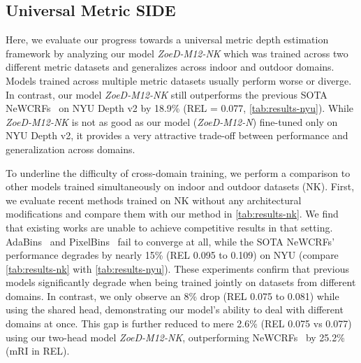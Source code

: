 \documentclass[10pt,twocolumn,letterpaper]{article}
\newcommand{\zoedmnk}{\textit{ZoeD-M12-NK}}
\begin{document}
\subsection{Universal Metric SIDE}
\label{sec:multi-dataset}
Here, we evaluate our progress towards a universal metric depth estimation framework by analyzing our model \textit{ZoeD-M12-NK} which was trained across two different metric datasets and generalizes across indoor and outdoor domains.
Models trained across multiple metric datasets usually perform worse or diverge. In contrast, our model \textit{ZoeD-M12-NK} still outperforms the previous SOTA NeWCRFs~\cite{yuan2022new} on NYU Depth v2 by 18.9\% (REL = 0.077, \cref{tab:results-nyu}).
 While \textit{ZoeD-M12-NK} is not as good as our model (\textit{ZoeD-M12-N}) fine-tuned only on NYU Depth v2, it provides a very attractive trade-off between performance and generalization across domains.
 
 To underline the difficulty of cross-domain training, we perform a comparison to other models trained simultaneously on indoor and outdoor datasets (NK). First, we evaluate recent methods trained on NK without any architectural modifications and compare them with our method in \cref{tab:results-nk}. 
We find that existing works are unable to achieve competitive results in that setting. AdaBins~\cite{bhat2021adabins} and PixelBins~\cite{pixelbinsSarwari:EECS-2021-32} fail to converge at all, while the SOTA NeWCRFs'~\cite{yuan2022new} performance degrades by nearly 15\% (REL 0.095 to 0.109) on NYU (compare \cref{tab:results-nk} with \cref{tab:results-nyu}). These experiments confirm that previous models significantly degrade when being trained jointly on datasets from different domains.
In contrast, we only observe an 8\% drop (REL 0.075 to 0.081) while using the shared head, demonstrating our model's ability to deal with different domains at once. This gap is further reduced to mere 2.6\% (REL 0.075 vs 0.077) using our two-head model \zoedmnk{}, outperforming NeWCRFs~\cite{yuan2022new} by 25.2\% (mRI in REL).  
\end{document}
